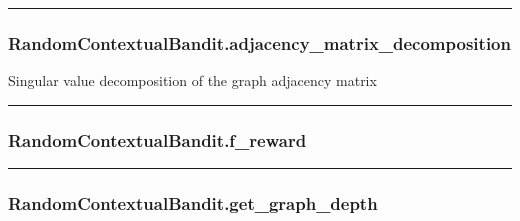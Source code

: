 \begin{center}\rule{0.5\linewidth}{\linethickness}\end{center}

\subsubsection{RandomContextualBandit.adjacency\_matrix\_decomposition}\label{randomcontextualbandit.adjacency_matrix_decomposition}

\begin{Shaded}
\begin{Highlighting}[]
\NormalTok{)}
\end{Highlighting}
\end{Shaded}

Singular value decomposition of the graph adjacency matrix

\begin{center}\rule{0.5\linewidth}{\linethickness}\end{center}

\subsubsection{RandomContextualBandit.f\_reward}\label{randomcontextualbandit.f_reward}

\begin{Shaded}
\begin{Highlighting}[]
\end{Highlighting}
\end{Shaded}

\begin{center}\rule{0.5\linewidth}{\linethickness}\end{center}

\subsubsection{RandomContextualBandit.get\_graph\_depth}\label{randomcontextualbandit.get_graph_depth}

\begin{Shaded}
\begin{Highlighting}[]
\NormalTok{)}
\end{Highlighting}
\end{Shaded}

